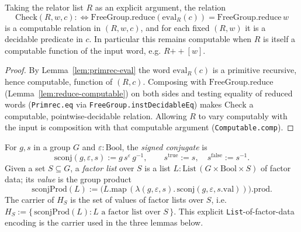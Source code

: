 \begin{lemma}
    \label{lem:eval-computable}
    Taking the relator list $R$ as an explicit argument, the relation
    \[
        \mathrm{Check}(R, w, c) :\Leftrightarrow
        \mathrm{FreeGroup.reduce}(\mathrm{eval}_R(c)) =
        \mathrm{FreeGroup.reduce}\,w
    \]
    is a computable relation in $(R, w, c)$, and for each fixed $(R, w)$ it is a
    decidable predicate in $c$. In particular this remains computable when $R$ is
    itself a computable function of the input word, e.g. $R \mathbin{+\!\!+} [w]$.
\end{lemma}
\begin{proof}
    By Lemma~\ref{lem:primrec-eval} the word $\mathrm{eval}_R(c)$ is a primitive
    recursive, hence computable, function of $(R, c)$. Composing with
    $\mathrm{FreeGroup.reduce}$ (Lemma~\ref{lem:reduce-computable}) on both sides
    and testing equality of reduced words (\texttt{Primrec.eq} via
    \texttt{FreeGroup.instDecidableEq}) makes $\mathrm{Check}$ a computable,
    pointwise-decidable relation. Allowing $R$ to vary computably with the input
    is composition with that computable argument (\texttt{Computable.comp}).
\end{proof}

\begin{definition}
    \label{def:signed-conj}
    For $g, s$ in a group $G$ and $\varepsilon : \mathrm{Bool}$, the \emph{signed
    conjugate} is
    \[
        \mathrm{sconj}(g, \varepsilon, s) := g\,s^{\varepsilon}\,g^{-1},
        \qquad s^{\mathrm{true}} := s,\quad s^{\mathrm{false}} := s^{-1}.
    \]
    Given a set $S \subseteq G$, a \emph{factor list} over $S$ is a list
    $L : \mathrm{List}\,(G \times \mathrm{Bool} \times S)$ of factor data; its
    \emph{value} is the group product
    \[
        \mathrm{sconjProd}(L) :=
        \bigl(L.\mathrm{map}\,(\lambda (g,\varepsilon,s).\,
        \mathrm{sconj}(g,\varepsilon,s.\mathrm{val}))\bigr).\mathrm{prod}.
    \]
    The carrier of $H_S$ is the set of values of factor lists over $S$, i.e.
    $H_S := \{\, \mathrm{sconjProd}(L) : L \text{ a factor list over } S \,\}$.
    This explicit \texttt{List}-of-factor-data encoding is the carrier used in the
    three lemmas below.
\end{definition}

